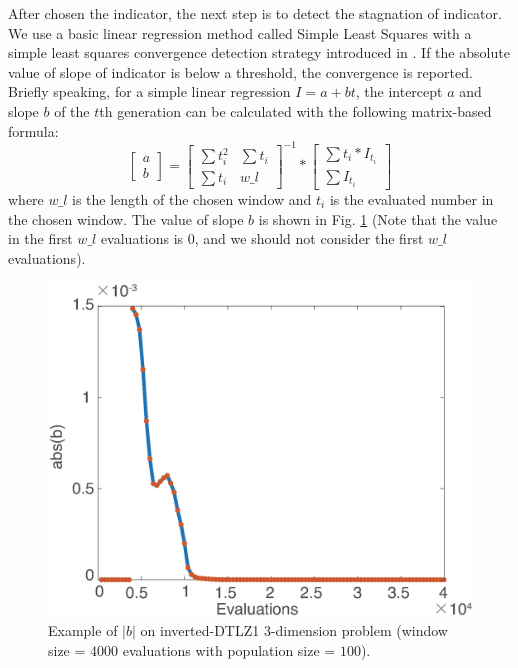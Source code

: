 \documentclass[conference]{IEEEtran}
\begin{document}
After chosen the indicator, the next step is to detect the stagnation of indicator.
We use a basic linear regression method called Simple Least Squares\cite{lscd27} with a
simple least squares convergence detection strategy introduced in \cite{lscd}.
If the absolute value of slope of indicator is below a threshold, the convergence is reported.
Briefly speaking, for a simple linear regression $I=a+bt$,
the intercept $a$ and slope $b$ of the $t$th generation can be calculated 
with the following matrix-based formula:
\begin{equation}\label{elr1}
  \left[
    \begin{matrix}
      a \\
      b
    \end{matrix}
  \right]
  = 
  \left[
    \begin{matrix}
      \sum t_i^2 & \sum t_i \\
      \sum t_i   & w\_ l 
    \end{matrix}
  \right]^{-1}
  *
  \left[
    \begin{matrix}
      \sum t_i * I_{t_i} \\
      \sum I_{t_i} 
    \end{matrix}
  \right]
\end{equation}
where $w\_ l$ is the length of the chosen window 
and $t_i$ is the evaluated number in the chosen window.
The value of slope $b$ is shown in Fig. \ref{wcd2} 
(Note that the value in the first $w\_ l$ evaluations is 0, 
and we should not consider the first $w\_ l$ evaluations). 
\begin{figure}[!t]
  \centering
    \includegraphics[width=\columnwidth]{FVEMOA_IDTLZ1_M3_nadir_2}
  \caption{Example of $\lvert b\rvert$ on inverted-DTLZ1 3-dimension problem
  (window size = $4000$ evaluations with population size = $100$).
  }
  \label{wcd2}
\end{figure}
\end{document}
